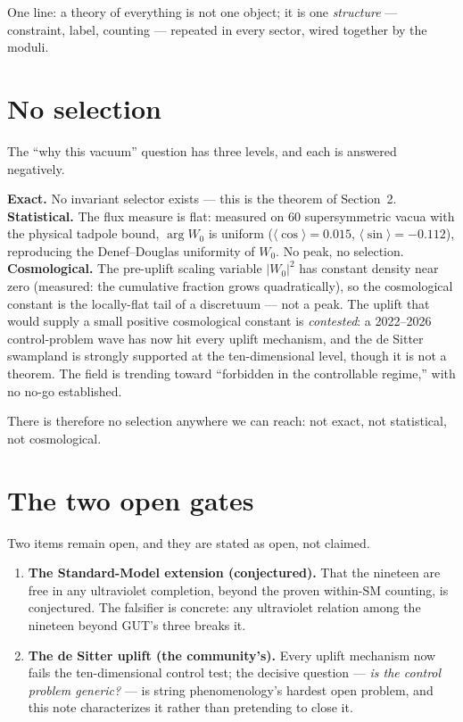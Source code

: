 \documentclass[11pt]{article}
\begin{document}
One line: a theory of everything is not one object; it is one \emph{structure} --- constraint,
label, counting --- repeated in every sector, wired together by the moduli.

\section{No selection}

The ``why this vacuum'' question has three levels, and each is answered negatively.

\textbf{Exact.} No invariant selector exists --- this is the theorem of Section~2. \textbf{Statistical.}
The flux measure is flat: measured on $60$ supersymmetric vacua with the physical tadpole bound,
$\arg W_0$ is uniform ($\langle\cos\rangle=0.015$, $\langle\sin\rangle=-0.112$), reproducing the
Denef--Douglas uniformity of $W_0$. No peak, no selection. \textbf{Cosmological.} The pre-uplift
scaling variable $|W_0|^2$ has constant density near zero (measured: the cumulative fraction grows
quadratically), so the cosmological constant is the locally-flat tail of a discretuum --- not a
peak. The uplift that would supply a small positive cosmological constant is \emph{contested}: a
2022--2026 control-problem wave has now hit every uplift mechanism, and the de Sitter swampland is
strongly supported at the ten-dimensional level, though it is not a theorem. The field is trending
toward ``forbidden in the controllable regime,'' with no no-go established.

There is therefore no selection anywhere we can reach: not exact, not statistical, not
cosmological.

\section{The two open gates}

Two items remain open, and they are stated as open, not claimed.

\begin{enumerate}
\item \textbf{The Standard-Model extension (conjectured).} That the nineteen are free in any
ultraviolet completion, beyond the proven within-SM counting, is conjectured. The falsifier is
concrete: any ultraviolet relation among the nineteen beyond GUT's three breaks it.
\item \textbf{The de Sitter uplift (the community's).} Every uplift mechanism now fails the
ten-dimensional control test; the decisive question --- \emph{is the control problem generic?} ---
is string phenomenology's hardest open problem, and this note characterizes it rather than
pretending to close it.
\end{enumerate}
\end{document}
